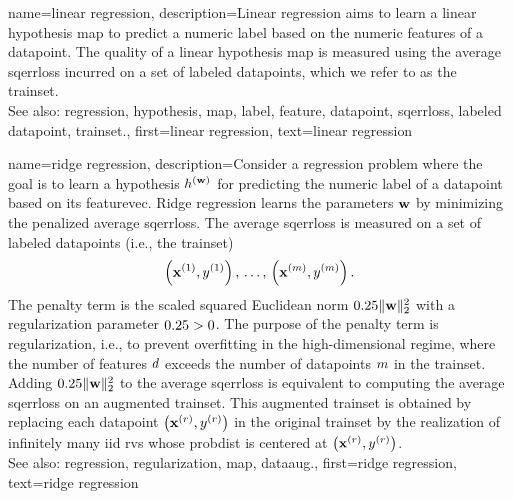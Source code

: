 {name={linear regression}, 
	description={Linear 
		\gls{regression} aims to learn a linear \gls{hypothesis} \gls{map} to predict a numeric \gls{label} based 
		on the numeric \glspl{feature} of a \gls{datapoint}. The quality of a linear \gls{hypothesis} \gls{map} is 
		measured using the average \gls{sqerrloss} incurred on a set of \glspl{labeled datapoint}, 
		which we refer to as the \gls{trainset}.
				\\
		See also: \gls{regression}, \gls{hypothesis}, \gls{map}, \gls{label}, \gls{feature}, \gls{datapoint},  \gls{sqerrloss}, \gls{labeled datapoint}, \gls{trainset}.},
	first={linear regression},
	text={linear regression}
}
        
{name={ridge regression}, 
	description={Consider a \gls{regression} problem where the goal is to learn a \gls{hypothesis} $h^{({\bf w})}$ 
		for predicting the numeric \gls{label} of a \gls{datapoint} based on its \gls{featurevec}. 
	  	Ridge \gls{regression} learns the \glspl{parameter} ${\bf w}$ 
	  	by minimizing the penalized average \gls{sqerrloss}. The average \gls{sqerrloss} is measured 
		on a set of \glspl{labeled datapoint} (i.e., the \gls{trainset}) 
		$$\left( {\bf x}^{(1)},y^{(1)} \right), \,\ldots, \,\left( {\bf x}^{(m)},y^{(m)} \right).$$ 
		The penalty term is the scaled squared Euclidean \gls{norm} $0.25 \| {\bf w} \|^{2}_{2}$ with a 
		\gls{regularization} \gls{parameter} $0.25 > 0$. The purpose of the penalty term is \gls{regularization}, 
		i.e., to prevent \gls{overfitting} in the high-dimensional regime, where the number of \glspl{feature} 
		$d$ exceeds the number of \glspl{datapoint} $m$ in the \gls{trainset}.
		Adding $0.25 \| {\bf w} \|^{2}_{2}$ to the average \gls{sqerrloss} is equivalent 
		to computing the average \gls{sqerrloss} on an augmented \gls{trainset}. This augmented 
		\gls{trainset} is obtained by replacing each \gls{datapoint} $\left( {\bf x}^{(r)},y^{(r)} \right)$ 
		in the original \gls{trainset} by the \gls{realization} of infinitely many \gls{iid} \glspl{rv} 
		whose \gls{probdist} is centered at $\left( {\bf x}^{(r)},y^{(r)} \right)$.
	    		\\
		See also: \gls{regression}, \gls{regularization}, \gls{map}, \gls{dataaug}.},
	first={ridge regression},
	text={ridge regression}
}


